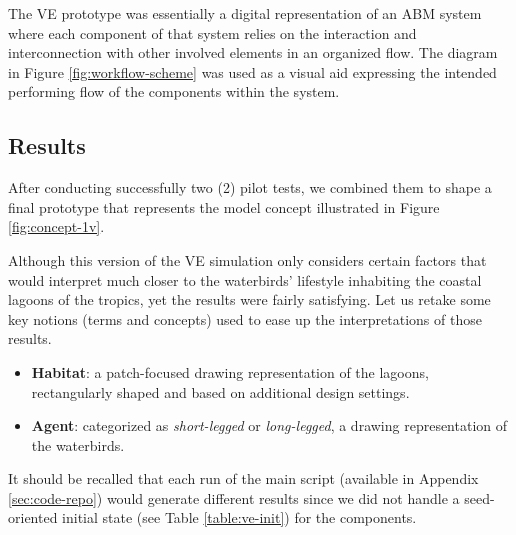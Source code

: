 The VE prototype was essentially a digital representation of an ABM system where each component of that system relies on the interaction and interconnection with other involved elements in an organized flow. The diagram in Figure \ref{fig:workflow-scheme} was used as a visual aid expressing the intended performing flow of the components within the system.

\subsection{Results}
After conducting successfully two (2) pilot tests, we combined them to shape a final prototype that represents the model concept illustrated in Figure \ref{fig:concept-1v}.

Although this version of the VE simulation only considers certain factors that would interpret much closer to the waterbirds' lifestyle inhabiting the coastal lagoons of the tropics, yet the results were fairly satisfying. Let us retake some key notions (terms and concepts) used to ease up the interpretations of those results.
\begin{itemize}
    \item \textbf{Habitat}: a patch-focused drawing representation of the lagoons, rectangularly shaped and based on additional design settings.
    \item \textbf{Agent}: categorized as \emph{short-legged} or \emph{long-legged}, a drawing representation of the waterbirds.
\end{itemize}

It should be recalled that each run of the main script (available in Appendix \ref{sec:code-repo}) would generate different results since we did not handle a seed-oriented initial state (see Table \ref{table:ve-init}) for the components.

